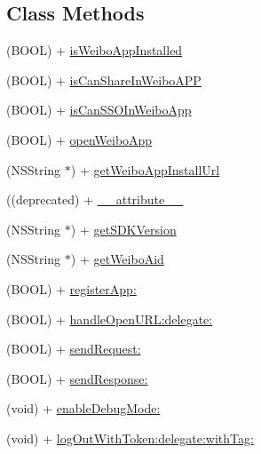 \subsection*{Class Methods}
\begin{DoxyCompactItemize}
\item 
(B\+O\+OL) + \mbox{\hyperlink{interface_weibo_s_d_k_af88507558450c5e2f390ecf8fb157071}{is\+Weibo\+App\+Installed}}
\item 
(B\+O\+OL) + \mbox{\hyperlink{interface_weibo_s_d_k_aa32c8c6bf4847f6cdc134cec9955f3d2}{is\+Can\+Share\+In\+Weibo\+A\+PP}}
\item 
(B\+O\+OL) + \mbox{\hyperlink{interface_weibo_s_d_k_adc233f097b5c5e0d99ebc326ffd2548a}{is\+Can\+S\+S\+O\+In\+Weibo\+App}}
\item 
(B\+O\+OL) + \mbox{\hyperlink{interface_weibo_s_d_k_aab11f361fa5ac787f89fdf8621d160bc}{open\+Weibo\+App}}
\item 
(N\+S\+String $\ast$) + \mbox{\hyperlink{interface_weibo_s_d_k_a49504103f9378dcde673b4c6b52b71e3}{get\+Weibo\+App\+Install\+Url}}
\item 
((deprecated) + \mbox{\hyperlink{interface_weibo_s_d_k_a40d5808e5f4f3957ef8255baeaa3c484}{\+\_\+\+\_\+attribute\+\_\+\+\_\+}}
\item 
(N\+S\+String $\ast$) + \mbox{\hyperlink{interface_weibo_s_d_k_a691f8c3d5605163a7873eb0dbc754f79}{get\+S\+D\+K\+Version}}
\item 
(N\+S\+String $\ast$) + \mbox{\hyperlink{interface_weibo_s_d_k_aec605d5ae27958199c450a8eda005298}{get\+Weibo\+Aid}}
\item 
(B\+O\+OL) + \mbox{\hyperlink{interface_weibo_s_d_k_ae11cd35ddd3b8ab9f0dea249e830aa72}{register\+App\+:}}
\item 
(B\+O\+OL) + \mbox{\hyperlink{interface_weibo_s_d_k_a4a0d371f214612aa4c31ff1096796203}{handle\+Open\+U\+R\+L\+:delegate\+:}}
\item 
(B\+O\+OL) + \mbox{\hyperlink{interface_weibo_s_d_k_a765c7577fb1d6bf1e4ebf0ecdd4f6268}{send\+Request\+:}}
\item 
(B\+O\+OL) + \mbox{\hyperlink{interface_weibo_s_d_k_af0a51ae27b64cf65bba05a1ea9c5d6e5}{send\+Response\+:}}
\item 
(void) + \mbox{\hyperlink{interface_weibo_s_d_k_a34fc58188a69b4585b4f49cda4f3cc17}{enable\+Debug\+Mode\+:}}
\item 
(void) + \mbox{\hyperlink{interface_weibo_s_d_k_aaa71820983aaf80d9893dd313ba0ceb9}{log\+Out\+With\+Token\+:delegate\+:with\+Tag\+:}}
\item 

\end{DoxyCompactItemize}
